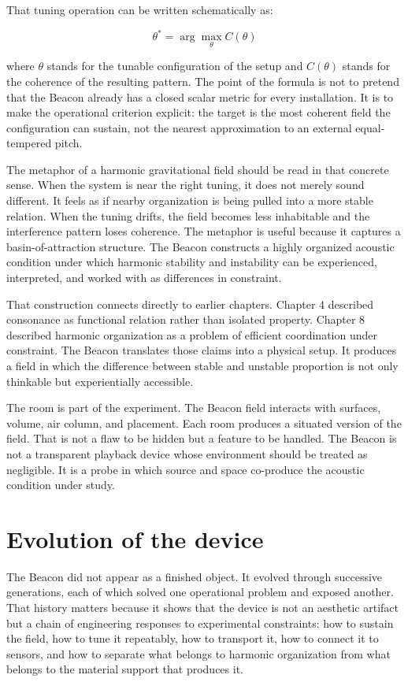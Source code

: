 That tuning operation can be written schematically as:

$$
\theta^* = \arg\max_{\theta} C(\theta)
$$

where $\theta$ stands for the tunable configuration of the setup and $C(\theta)$ stands for the coherence of the resulting pattern. The point of the formula is not to pretend that the Beacon already has a closed scalar metric for every installation. It is to make the operational criterion explicit: the target is the most coherent field the configuration can sustain, not the nearest approximation to an external equal-tempered pitch.

The metaphor of a harmonic gravitational field should be read in that concrete sense. When the system is near the right tuning, it does not merely sound different. It feels as if nearby organization is being pulled into a more stable relation. When the tuning drifts, the field becomes less inhabitable and the interference pattern loses coherence. The metaphor is useful because it captures a basin-of-attraction structure. The Beacon constructs a highly organized acoustic condition under which harmonic stability and instability can be experienced, interpreted, and worked with as differences in constraint.

That construction connects directly to earlier chapters. Chapter 4 described consonance as functional relation rather than isolated property. Chapter 8 described harmonic organization as a problem of efficient coordination under constraint. The Beacon translates those claims into a physical setup. It produces a field in which the difference between stable and unstable proportion is not only thinkable but experientially accessible.


The room is part of the experiment. The Beacon field interacts with surfaces, volume, air column, and placement. Each room produces a situated version of the field. That is not a flaw to be hidden but a feature to be handled. The Beacon is not a transparent playback device whose environment should be treated as negligible. It is a probe in which source and space co-produce the acoustic condition under study.


\section{Evolution of the device}


The Beacon did not appear as a finished object. It evolved through successive generations, each of which solved one operational problem and exposed another. That history matters because it shows that the device is not an aesthetic artifact but a chain of engineering responses to experimental constraints: how to sustain the field, how to tune it repeatably, how to transport it, how to connect it to sensors, and how to separate what belongs to harmonic organization from what belongs to the material support that produces it.

